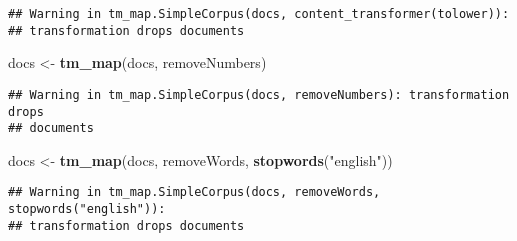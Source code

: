 \documentclass[]{article}
\newenvironment{Shaded}{\begin{snugshade}}{\end{snugshade}}
\newcommand{\KeywordTok}[1]{\textcolor[rgb]{0.13,0.29,0.53}{\textbf{#1}}}
\newcommand{\NormalTok}[1]{#1}
\newcommand{\StringTok}[1]{\textcolor[rgb]{0.31,0.60,0.02}{#1}}
\begin{document}
\begin{verbatim}
## Warning in tm_map.SimpleCorpus(docs, content_transformer(tolower)):
## transformation drops documents
\end{verbatim}

\begin{Shaded}
\begin{Highlighting}[]
\NormalTok{docs <-}\StringTok{ }\KeywordTok{tm_map}\NormalTok{(docs, removeNumbers)}
\end{Highlighting}
\end{Shaded}

\begin{verbatim}
## Warning in tm_map.SimpleCorpus(docs, removeNumbers): transformation drops
## documents
\end{verbatim}

\begin{Shaded}
\begin{Highlighting}[]
\NormalTok{docs <-}\StringTok{ }\KeywordTok{tm_map}\NormalTok{(docs, removeWords, }\KeywordTok{stopwords}\NormalTok{(}\StringTok{"english"}\NormalTok{))}
\end{Highlighting}
\end{Shaded}

\begin{verbatim}
## Warning in tm_map.SimpleCorpus(docs, removeWords, stopwords("english")):
## transformation drops documents
\end{verbatim}
\end{document}
